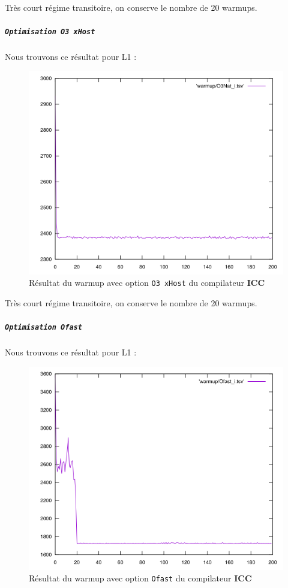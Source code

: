 \documentclass{report}
\begin{document}
Très court régime transitoire, on conserve le nombre de 20 warmups.
\newpage
\subparagraph{ \texttt{Optimisation O3 xHost}}
Nous trouvons ce résultat pour L1 :
  \begin{figure}[ht!]
    \centering
    \includegraphics[scale=0.45]{resources/L1/warmup/O3Nat_i.png}
    \caption{Résultat du warmup avec option \texttt{O3 xHost} du compilateur \textbf{ICC}}
  \end{figure}

  Très court régime transitoire, on conserve le nombre de 20 warmups.
  \newpage
\subparagraph{ \texttt{Optimisation Ofast}}
Nous trouvons ce résultat pour L1 :
  \begin{figure}[ht!]
    \centering
    \includegraphics[scale=0.45]{resources/L1/warmup/Ofast_i.png}
    \caption{Résultat du warmup avec option \texttt{Ofast} du compilateur \textbf{ICC}}
  \end{figure}
\end{document}
